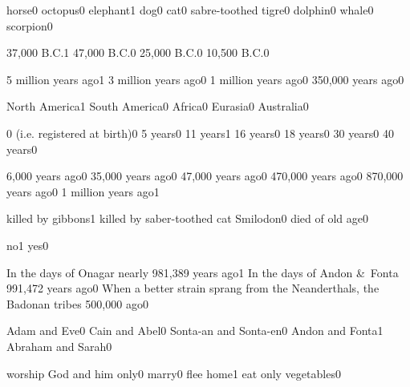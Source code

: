 {horse}{0}
{octopus}{0}
{elephant}{1}
{dog}{0}
{cat}{0}
{sabre-toothed tigre}{0}
{dolphin}{0}
{whale}{0}
{scorpion}{0}
\qstop

{37,000 B.C.}{1}
{47,000 B.C.}{0}
{25,000 B.C.}{0}
{10,500 B.C.}{0}
\qstop

{5 million years ago}{1}
{3 million years ago}{0}
{1 million years ago}{0}
{350,000 years ago}{0}
\qstop

{North America}{1}
{South America}{0}
{Africa}{0}
{Eurasia}{0}
{Australia}{0}
\qstop

{0 (i.e. registered at birth)}{0}
{5 years}{0}
{11 years}{1}
{16 years}{0}
{18 years}{0}
{30 years}{0}
{40 years}{0}
\qstop


{6,000 years ago}{0}
{35,000 years ago}{0}
{47,000 years ago}{0}
{470,000 years ago}{0}
{870,000 years ago}{0}
{1 million years ago}{1}
\qstop

{killed by gibbons}{1}
{killed by saber-toothed cat Smilodon}{0}
{died of old age}{0}
\qstop

{no}{1}
{yes}{0}
\qstop


{In the days of Onagar nearly 981,389 years ago}{1}
{In the days of Andon \&\ Fonta 991,472 years ago}{0}
{When a better strain sprang from the Neanderthals, the Badonan tribes 500,000 ago}{0}
\qstop

{Adam and Eve}{0}
{Cain and Abel}{0}
{Sonta\hyp{}an and Sonta\hyp{}en}{0}
{Andon and Fonta}{1}
{Abraham and Sarah}{0}
\qstop

{worship God and him only}{0}
{marry}{0}
{flee home}{1}
{eat only vegetables}{0}
\qstop

